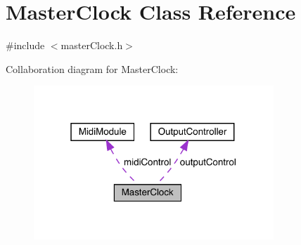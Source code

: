 \hypertarget{class_master_clock}{}\section{Master\+Clock Class Reference}
\label{class_master_clock}


{\ttfamily \#include $<$master\+Clock.\+h$>$}



Collaboration diagram for Master\+Clock\+:
\nopagebreak
\begin{figure}[H]
\begin{center}
\leavevmode
\includegraphics[width=256pt]{class_master_clock__coll__graph}
\end{center}
\end{figure}
